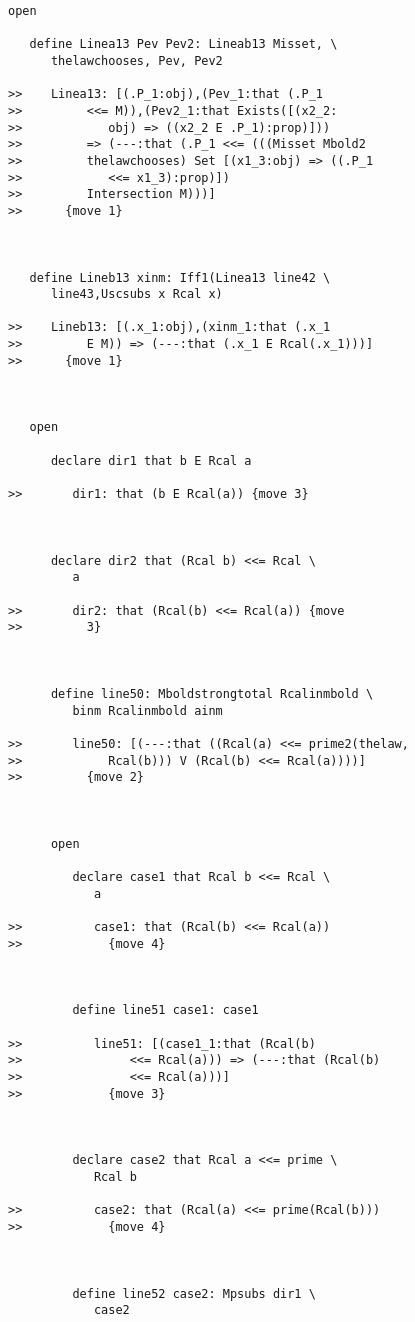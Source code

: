 \documentclass[12pt]{article}
\begin{document}
\begin{verbatim}
open

   define Linea13 Pev Pev2: Lineab13 Misset, \
      thelawchooses, Pev, Pev2

>>    Linea13: [(.P_1:obj),(Pev_1:that (.P_1
>>         <<= M)),(Pev2_1:that Exists([(x2_2:
>>            obj) => ((x2_2 E .P_1):prop)]))
>>         => (---:that (.P_1 <<= (((Misset Mbold2
>>         thelawchooses) Set [(x1_3:obj) => ((.P_1
>>            <<= x1_3):prop)])
>>         Intersection M)))]
>>      {move 1}



   define Lineb13 xinm: Iff1(Linea13 line42 \
      line43,Uscsubs x Rcal x)

>>    Lineb13: [(.x_1:obj),(xinm_1:that (.x_1
>>         E M)) => (---:that (.x_1 E Rcal(.x_1)))]
>>      {move 1}



   open

      declare dir1 that b E Rcal a

>>       dir1: that (b E Rcal(a)) {move 3}



      declare dir2 that (Rcal b) <<= Rcal \
         a

>>       dir2: that (Rcal(b) <<= Rcal(a)) {move
>>         3}



      define line50: Mboldstrongtotal Rcalinmbold \
         binm Rcalinmbold ainm

>>       line50: [(---:that ((Rcal(a) <<= prime2(thelaw,
>>            Rcal(b))) V (Rcal(b) <<= Rcal(a))))]
>>         {move 2}



      open

         declare case1 that Rcal b <<= Rcal \
            a

>>          case1: that (Rcal(b) <<= Rcal(a))
>>            {move 4}



         define line51 case1: case1

>>          line51: [(case1_1:that (Rcal(b)
>>               <<= Rcal(a))) => (---:that (Rcal(b)
>>               <<= Rcal(a)))]
>>            {move 3}



         declare case2 that Rcal a <<= prime \
            Rcal b

>>          case2: that (Rcal(a) <<= prime(Rcal(b)))
>>            {move 4}



         define line52 case2: Mpsubs dir1 \
            case2


\end{verbatim}
\end{document}
